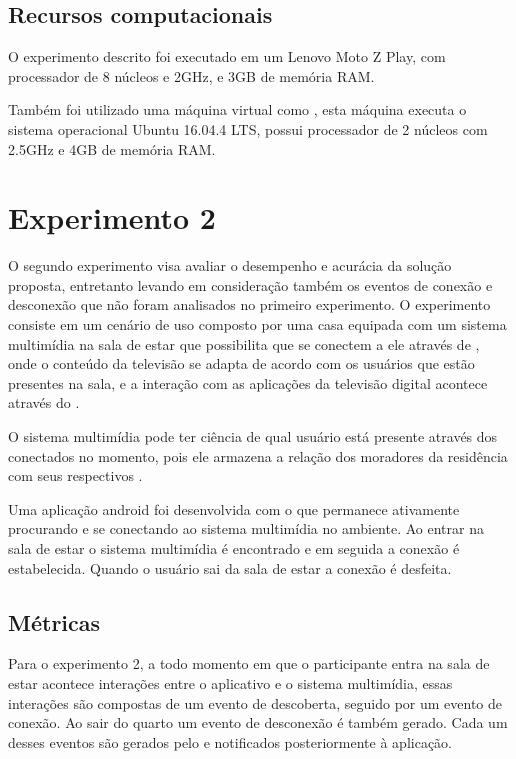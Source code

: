\subsection{Recursos computacionais}

O experimento descrito foi executado em um \smartphone{} Lenovo Moto Z Play, com processador de 8 núcleos e 2GHz, e 3GB de memória RAM.

Também foi utilizado uma máquina virtual como \broker{} \mqtt{}, esta máquina executa o sistema operacional Ubuntu 16.04.4 LTS, possui processador de 2 núcleos com 2.5GHz e 4GB de memória RAM.

\section{Experimento 2}

O segundo experimento visa avaliar o desempenho e acurácia da solução proposta, entretanto levando em consideração também os eventos de conexão e desconexão que não foram analisados no primeiro experimento. O experimento consiste em um cenário de uso composto por uma casa equipada com um sistema multimídia na sala de estar que possibilita que \smartphones{} se conectem a ele através de \bluetooth{}, onde o conteúdo da televisão se adapta de acordo com os usuários que estão presentes na sala, e a interação com as aplicações da televisão digital acontece através do \smartphone{}.

O sistema multimídia pode ter ciência de qual usuário está presente através dos \smartphones{} conectados no momento, pois ele armazena a relação dos moradores da residência com seus respectivos \smartphones{}.

Uma aplicação android foi desenvolvida com o \middleware{} \mhubcddl{} que permanece ativamente procurando e se conectando ao sistema multimídia no ambiente. Ao entrar na sala de estar o sistema multimídia é encontrado e em seguida a conexão é estabelecida. Quando o usuário sai da sala de estar a conexão é desfeita. 

\subsection{Métricas}

Para o experimento 2, a todo momento em que o participante entra na sala de estar acontece interações entre o aplicativo e o sistema multimídia, essas interações são compostas de um evento de descoberta, seguido por um evento de conexão. Ao sair do quarto um evento de desconexão é também gerado. Cada um desses eventos são gerados pelo \stwopa{} e notificados posteriormente à aplicação.

